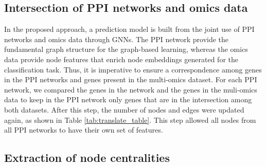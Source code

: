 \subsection{Intersection of PPI networks and omics data}

In the proposed approach, a prediction model is built from the joint use of PPI networks and omics data through GNNs. The PPI network provide the fundamental graph structure for the graph-based learning, whereas the omics data provide node features that enrich node embeddings generated for the classification task. Thus, it is imperative to ensure a correspondence among genes in the PPI networks and genes present in the multi-omics dataset. For each PPI network, we compared the genes in the network and the genes in the muli-omics data to keep in the PPI network only genes that are in the intersection among both datasets. After this step, the number of nodes and edges were updated again, as shown in Table \ref{tab:translate_table}. This step allowed all nodes from all PPI networks to have their own set of features.




\subsection{Extraction of node centralities}


